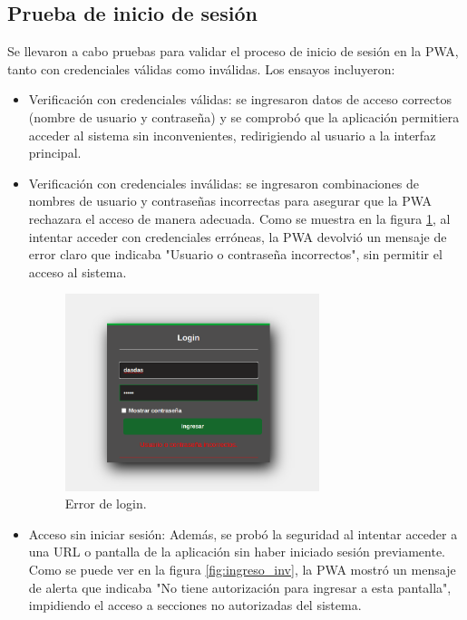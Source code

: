 \subsection{Prueba de inicio de sesión}

Se llevaron a cabo pruebas para validar el proceso de inicio de sesión en la PWA, tanto con credenciales válidas como inválidas. Los ensayos incluyeron:

\begin{itemize}
    \item Verificación con credenciales válidas: se ingresaron datos de acceso correctos (nombre de usuario y contraseña) y se comprobó que la aplicación permitiera acceder al sistema sin inconvenientes, redirigiendo al usuario a la interfaz principal.
    
    \item Verificación con credenciales inválidas: se ingresaron combinaciones de nombres de usuario y contraseñas incorrectas para asegurar que la PWA rechazara el acceso de manera adecuada. Como se muestra en la figura \ref{fig:error_login}, al intentar acceder con credenciales erróneas, la PWA devolvió un mensaje de error claro que indicaba "Usuario o contraseña incorrectos", sin permitir el acceso al sistema.


\begin{figure}[H]
\centering 
\includegraphics[width=0.7\textwidth]{./Figures/login_inc.png}
\caption{Error de login.}
\label{fig:error_login}
\end{figure}
   

\item Acceso sin iniciar sesión: Además, se probó la seguridad al intentar acceder a una URL o pantalla de la aplicación sin haber iniciado sesión previamente. Como se puede ver en la figura \ref{fig:ingreso_inv}, la PWA mostró un mensaje de alerta que indicaba "No tiene autorización para ingresar a esta pantalla", impidiendo el acceso a secciones no autorizadas del sistema.


\end{itemize}
